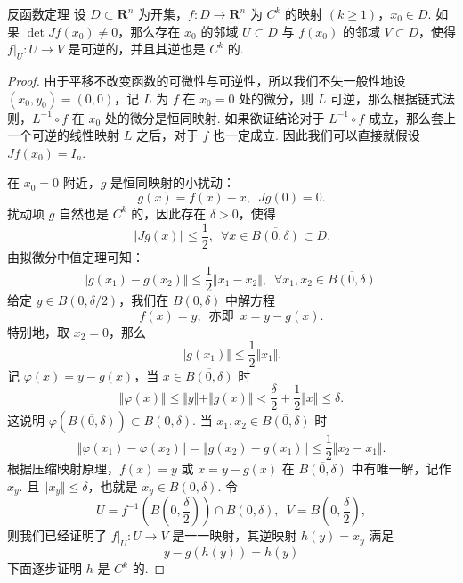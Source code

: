 \begin{theorem}{反函数定理}{}
    设 $D\subset \mathbf{R}^n$ 为开集，$f\colon D\to\mathbf{R}^n$ 为 $C^{k}$ 的映射 $(k\geqslant 1)$，$x_0\in D$. 如果 $\det Jf(x_0)\neq 0$，那么存在 $x_0$ 的邻域 $U\subset D$ 与 $f(x_0)$ 的邻域 $V\subset D$，使得 $\left.f\right|_U \colon U\to V$ 是可逆的，并且其逆也是 $C^k$ 的.
\end{theorem}

\begin{proof}

    由于平移不改变函数的可微性与可逆性，所以我们不失一般性地设 $(x_0, y_0) = (0, 0)$，记 $L$ 为 $f$ 在 $x_0 = 0$ 处的微分，则 $L$ 可逆，那么根据链式法则，$L^{-1}\circ f$ 在 $x_0$ 处的微分是恒同映射. 如果欲证结论对于 $L^{-1}\circ f$ 成立，那么套上一个可逆的线性映射 $L$ 之后，对于 $f$ 也一定成立. 因此我们可以直接就假设 $Jf(x_0) = I_n$.

    在 $x_0 = 0$ 附近，$g$ 是恒同映射的小扰动：\[g(x) = f(x) - x,\enspace Jg(0) = 0.\]
    扰动项 $g$ 自然也是 $C^k$ 的，因此存在 $\delta > 0$，使得\[\Vert Jg(x)\Vert \leqslant \frac{1}{2},\enspace \forall x\in \overline{B(0, \delta)}\subset D.\]
    由拟微分中值定理可知：\[\Vert g(x_1) - g(x_2)\Vert \leqslant \frac{1}{2}\Vert x_1 - x_2\Vert,\enspace \forall x_1, x_2\in \overline{B(0, \delta)}.\]
    给定 $y\in B(0, \delta/2)$，我们在 $B(0, \delta)$ 中解方程 \[f(x) = y,\enspace\text{亦即}\enspace x = y - g(x).\]
    特别地，取 $x_2 = 0$，那么 \[\Vert g(x_1) \Vert \leqslant \frac{1}{2}\Vert x_1\Vert.\]
    记 $\varphi(x) = y - g(x)$，当 $x\in \overline{B(0, \delta)}$ 时\[\Vert \varphi(x)\Vert \leqslant \Vert y\Vert +\Vert g(x)\Vert < \frac{\delta}{2} + \frac{1}{2}\Vert x\Vert \leqslant \delta.\]
    这说明 $\varphi(\overline{B(0, \delta)})\subset B(0, \delta)$. 当 $x_1, x_2\in \overline{B(0, \delta)}$ 时\[\Vert \varphi(x_1) - \varphi(x_2) \Vert = \Vert g(x_2) - g(x_1)\Vert \leqslant \frac{1}{2}\Vert x_2 - x_1\Vert.\]
    根据压缩映射原理，$f(x) = y$ 或 $x = y - g(x)$ 在 $\overline{B(0, \delta)}$ 中有唯一解，记作 $x_y$. 且 $\Vert x_y\Vert \leqslant \delta$，也就是 $x_y\in B(0, \delta)$. 令\[U = f^{-1}(B(0, \frac{\delta}{2}))\cap B(0, \delta),\enspace V = B(0, \frac{\delta}{2}),\]
    则我们已经证明了 $\left.f\right|_U \colon U\to V$ 是一一映射，其逆映射 $h(y) = x_y$ 满足 \[y - g(h(y)) = h(y)\]
    下面逐步证明 $h$ 是 $C^k$ 的.


\end{proof}
